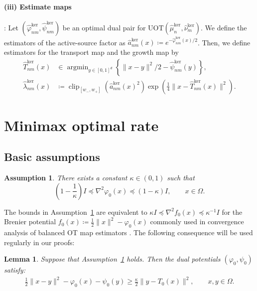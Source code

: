 \documentclass[11pt,reqno]{amsart}
\newtheorem{lemma}[theorem]{Lemma}
\newtheorem{assumption}{Assumption}
\theoremstyle{definition}
\renewcommand{\hat}{\widehat}
\DeclareMathOperator*{\argmin}{arg min}
\DeclareMathOperator{\clip}{clip}
\begin{document}
\paragraph{(iii) Estimate maps}:
Let $(\hat\varphi_{nm}^{\mathrm{ker}},\hat\psi_{nm}^{\mathrm{ker}})$ be an optimal dual pair for
$\mathrm{UOT}(\hat\mu_n^{\mathrm{ker}},\hat\nu_m^{\mathrm{ker}})$. We define the estimators of the active-source factor as $\hat a_{nm}^{\mathrm{ker}}(x)
    \coloneqq
    e^{-\hat\varphi_{nm}^{\mathrm{ker}}(x)/2}$.
    Then, we define estimators for the transport map and the growth map by
\begin{align} \label{eq:kernel_estimator}
    \hat T_{nm}^{\mathrm{ker}}(x)
    &\in
    \argmin_{y\in[0,1]^d}
    \left\{
        \|x-y\|^2/2 - \hat\psi_{nm}^{\mathrm{ker}}(y)
    \right\},\\
    \hat\lambda_{nm}^{\mathrm{ker}}(x)
    &\coloneqq
     \clip_{[w_-,w_+]}(\hat a_{nm}^{\mathrm{ker}}(x)^2)
    \exp\left(\frac14\|x-\hat T_{nm}^{\mathrm{ker}}(x)\|^2\right).
\end{align}


\section{Minimax optimal rate}


\subsection{Basic assumptions}


\begin{assumption}\label{assm:curvature}
There exists a constant $\kappa \in (0, 1)$ such that 
\[
    \left(1 - \frac{1}{\kappa}\right)I \preceq \nabla^2 \varphi_0(x) \preceq (1 - \kappa)I, \qquad x \in \Omega.
\]
\end{assumption}
The bounds in Assumption~\ref{assm:curvature} are equivalent to $\kappa I \preceq \nabla^2 f_0(x) \preceq \kappa^{-1} I$ for the Brenier potential $f_0(x) \coloneqq \frac{1}{2}\|x\|^2 - \varphi_0(x)$ commonly used in convergence analysis of balanced OT map estimators \cite{hutter2021minimax,manole2024plugin,divol2025general}. The following consequence will be used regularly in our proofs:
\begin{lemma}
\label{lem:uot_gap_sufficient}
Suppose that Assumption~\ref{assm:curvature} holds. Then the dual potentials $(\varphi_0,\psi_0)$ satisfy:
\begin{align}
    \frac{1}{2}\|x-y\|^2-\varphi_0(x)-\psi_0(y)
    \ge \frac{\kappa}{2}\|y-T_0(x)\|^2,
    \qquad x,y\in\Omega.
\end{align}
\end{lemma}
\end{document}
